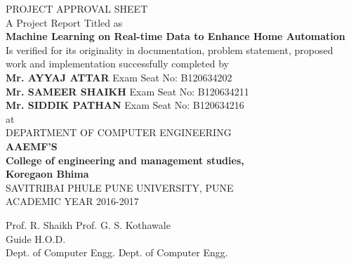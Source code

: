 \newpage
\thispagestyle{empty}

\begin{center}

PROJECT APPROVAL SHEET\\[3\baselineskip]



{\small A Project Report Titled as}\\[\baselineskip]

\textbf{{\large Machine Learning on Real-time Data to Enhance Home Automation}}\\[\baselineskip]

Is verified for its originality in documentation, problem statement, proposed\\
work and implementation successfully completed by\\[2\baselineskip]


\textbf{Mr. AYYAJ ATTAR} Exam Seat No: B120634202\\
\textbf{Mr. SAMEER SHAIKH} Exam Seat No: B120634211\\
\textbf{Mr. SIDDIK PATHAN} Exam Seat No: B120634216\\[\baselineskip]

at\\[4\baselineskip]




DEPARTMENT OF COMPUTER ENGINEERING\\
\textbf{AAEMF’S}\\
\textbf{College of engineering and management studies,}\\
\textbf{Koregaon Bhima}\\
SAVITRIBAI PHULE PUNE UNIVERSITY, PUNE\\
ACADEMIC YEAR 2016-2017\\

\vfill

\noindent
\hspace*{0.75cm}Prof. R. Shaikh \hfill Prof. G. S. Kothawale\hspace*{0.25cm} \\
\hspace*{1.75cm}Guide \hfill H.O.D.\hspace*{1.5cm} \\
Dept. of Computer Engg. \hfill Dept. of Computer Engg.


\end{center}
